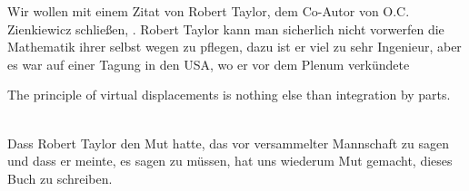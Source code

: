 Wir wollen mit einem Zitat von Robert Taylor, dem Co-Autor von O.C. Zienkiewicz schlie{\ss}en, \cite{Taylor}. Robert Taylor kann man sicherlich nicht vorwerfen die Mathematik ihrer selbst wegen zu pflegen, dazu ist er viel zu sehr Ingenieur, aber es war auf einer Tagung in den USA, wo er vor dem Plenum verk\"{u}ndete\\

\hspace*{-12pt}\colorbox{hellgrau}{\parbox{0.98\textwidth}{The principle of virtual displacements is nothing else than integration by parts.}}\\

Dass Robert Taylor den Mut hatte, das \glq vor versammelter Mannschaft\grq{} zu sagen und dass er meinte, es sagen zu m\"{u}ssen, hat uns wiederum Mut gemacht, dieses Buch zu schreiben.

